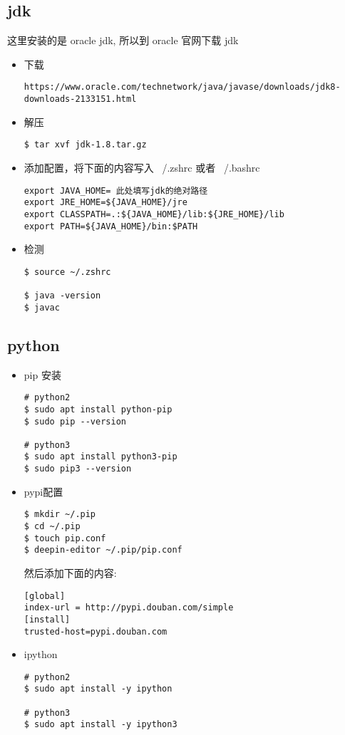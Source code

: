 \subsection{jdk}
这里安装的是 oracle jdk, 所以到 oracle 官网下载 jdk
\begin{itemize}
\item 下载
\begin{lstlisting}
https://www.oracle.com/technetwork/java/javase/downloads/jdk8-downloads-2133151.html
\end{lstlisting}


\item 解压
\begin{lstlisting}
$ tar xvf jdk-1.8.tar.gz
\end{lstlisting}

\item 添加配置，将下面的内容写入 ~/.zshrc 或者 ~/.bashrc
\begin{lstlisting}
export JAVA_HOME= 此处填写jdk的绝对路径
export JRE_HOME=${JAVA_HOME}/jre
export CLASSPATH=.:${JAVA_HOME}/lib:${JRE_HOME}/lib
export PATH=${JAVA_HOME}/bin:$PATH
\end{lstlisting}

\item 检测 
\begin{lstlisting}
$ source ~/.zshrc 

$ java -version 
$ javac 
\end{lstlisting}
\end{itemize}
\newpage

\subsection{python}
\begin{itemize}
\item pip 安装
\begin{lstlisting}
# python2
$ sudo apt install python-pip
$ sudo pip --version

# python3
$ sudo apt install python3-pip
$ sudo pip3 --version
\end{lstlisting}

\item pypi配置
\begin{lstlisting}
$ mkdir ~/.pip
$ cd ~/.pip
$ touch pip.conf
$ deepin-editor ~/.pip/pip.conf 
\end{lstlisting}

然后添加下面的内容:
\begin{lstlisting}
[global]
index-url = http://pypi.douban.com/simple
[install]
trusted-host=pypi.douban.com
\end{lstlisting}

\item ipython
\begin{lstlisting}
# python2
$ sudo apt install -y ipython

# python3
$ sudo apt install -y ipython3 
\end{lstlisting}
\end{itemize}
\newpage


